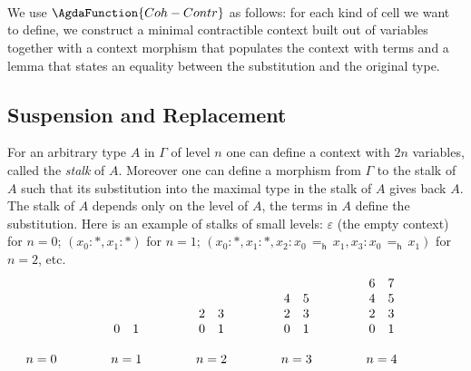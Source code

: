 \begin{code}\>\<%
\\
\> \<[15]%
\>[15]\AgdaSymbol{:} \AgdaSymbol{\}\{} \AgdaSymbol{:}  \AgdaSymbol{\}}      \<%
\\
\>  \<[15]%
\>[15]\AgdaSymbol{=}    \AgdaSymbol{\_}    \<%
\\
\>\<\end{code}
We use $\AgdaFunction{Coh-Contr}$ as follows: for each kind of cell we
want to define, we construct a minimal contractible context built out
of variables together with a context morphism that populates the
context with terms and a lemma that states an equality
between the substitution and the original type.


\subsection{Suspension and Replacement}
\label{sec:susp-and-repl}
%
For an arbitrary type $A$ in $\Gamma$ of level $n$ one can
define a context with $2n$
variables, called the \emph{stalk} of $A$. Moreover one can
define a morphism from $\Gamma$ to the stalk of $A$ such that its
substitution into the maximal type in the stalk of $A$ gives back
$A$. The stalk of $A$ depends only on the level of $A$, the terms in
$A$ define the substitution. Here is an example of stalks of small
levels: $\varepsilon$ (the empty context) for $n=0$; $(x_0 : *, x_1 : *)$ for
$n=1$; $(x_0 : *, x_1 : *, x_2 : x_0\,=_\mathsf{h}\,x_1, x_3 :
x_0\,=_\mathsf{h}\,x_1)$ for $n=2$, etc. 
 \[
 \begin{array}{c@{\hspace{1.5cm}} c@{\hspace{1.5cm}} c@{\hspace{1.5cm}} c@{\hspace{1.5cm}} c@{\hspace{1.5cm}}}
 &&&&6\quad 7\\
 &&&4\quad 5&4 \quad 5\\
 &&2\quad 3&2\quad 3&2\quad 3\\
 &0\quad 1&0\quad 1&0\quad 1&0\quad 1\\
 \\
 n = 0 & n = 1 & n = 2 & n = 3 & n = 4 
 \end{array}
 \]

